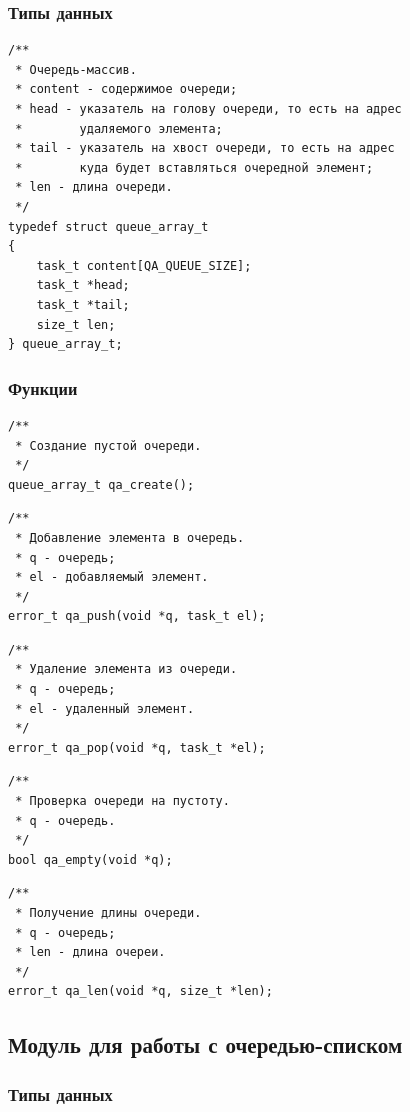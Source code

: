 \documentclass[a4paper,12pt]{extarticle}
\begin{document}
\subsubsection{Типы данных}

\begin{verbatim}
/**
 * Очередь-массив.
 * content - содержимое очереди;
 * head - указатель на голову очереди, то есть на адрес
 *        удаляемого элемента;
 * tail - указатель на хвост очереди, то есть на адрес
 *        куда будет вставляться очередной элемент;
 * len - длина очереди.
 */
typedef struct queue_array_t
{
    task_t content[QA_QUEUE_SIZE];
    task_t *head;
    task_t *tail;
    size_t len;
} queue_array_t;
\end{verbatim}

\subsubsection{Функции}

\begin{verbatim}
/**
 * Создание пустой очереди.
 */
queue_array_t qa_create();
\end{verbatim}

\begin{verbatim}
/**
 * Добавление элемента в очередь.
 * q - очередь;
 * el - добавляемый элемент.
 */
error_t qa_push(void *q, task_t el);
\end{verbatim}

\begin{verbatim}
/**
 * Удаление элемента из очереди.
 * q - очередь;
 * el - удаленный элемент.
 */
error_t qa_pop(void *q, task_t *el);
\end{verbatim}

\begin{verbatim}
/**
 * Проверка очереди на пустоту.
 * q - очередь.
 */
bool qa_empty(void *q);
\end{verbatim}

\begin{verbatim}
/**
 * Получение длины очереди.
 * q - очередь;
 * len - длина очереи.
 */
error_t qa_len(void *q, size_t *len);	
\end{verbatim}


\subsection{Модуль для работы с очередью-списком}
\subsubsection{Типы данных}
\end{document}
